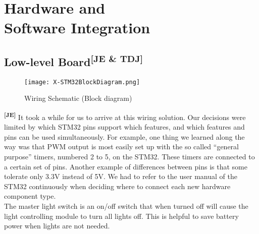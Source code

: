 \chapter[Hardware and Software Integration]{Hardware and\\Software Integration}
\hypertarget{hwinttgt}{}
\label{hwintlbl}
\section[Low-level Board]{Low-level Board\textsuperscript{[JE \& TDJ]}}
\begin{figure}[ht]
  \centering
  \texttt{[image: X-STM32BlockDiagram.png]}
  \caption{Wiring Schematic (Block diagram)}
  \label{blockdiag}
\end{figure}
\textsuperscript{\textbf{[JE]}}
It took a while for us to arrive at this wiring solution. Our decisions were
limited by which STM32 pins support which features, and which features and pins
can be used simultaneously. For example, one thing we learned along the way was
that PWM output is most easily set up with the so called ``general purpose''
timers, numbered 2 to 5, on the STM32. These timers are connected to a certain
set of pins. Another example of differences between pins is that some tolerate
only 3.3V instead of 5V. We had to refer to the user manual of the STM32
continuously when deciding where to connect each new hardware component type.\\

\noindent
The master light switch is an on/off switch that when turned off will cause the
light controlling module to turn all lights off. This is helpful to save battery
power when lights are not needed.\\

